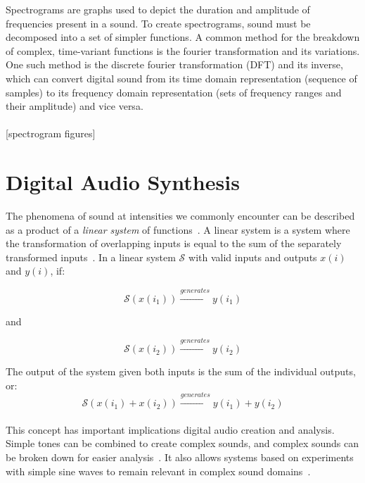 \documentclass[\main/thesis.tex]{subfiles}
\begin{document}
Spectrograms are graphs used to depict the duration and amplitude of frequencies present in a sound. To create spectrograms, sound must be decomposed into a set of simpler functions. A common method for the breakdown of complex, time-variant functions is the fourier transformation and its variations. One such method is the discrete fourier transformation (DFT) and its inverse, which can convert digital sound from its time domain representation (sequence of samples) to its frequency domain representation (sets of frequency ranges and their amplitude) and vice versa.\\\\

[spectrogram figures]


\section{Digital Audio Synthesis}
\label{sec_digital_synthesis}
The phenomena of sound at intensities we commonly encounter can be described as a product of a \textit{linear system} of functions~\cite{cook1999chap4}. A linear system is a system where the transformation of overlapping inputs is equal to the sum of the separately transformed inputs~\cite{lyons2004understandingChap1,cook1999chap4}. In a linear system $\mathcal{S}$ with valid inputs and outputs $x(i)$ and $y(i)$, if:

\begin{equation}
 \mathcal{S}(x(i_1)) \xrightarrow{generates} y(i_1)
\end{equation}
\begin{center}
    and
\end{center}
\begin{equation}
\mathcal{S}(x(i_2)) \xrightarrow{generates}y(i_2)
\end{equation}

The output of the system given both inputs is the sum of the individual outputs, or:
\begin{equation}
 \mathcal{S}(x(i_1)+x(i_2)) \xrightarrow{generates} y(i_1)+y(i_2) 
\end{equation}
\\
This concept has important implications digital audio creation and analysis. Simple tones can be combined to create complex sounds, and complex sounds can be broken down for easier analysis~\cite{lyons2004understandingChap1}. It also allows systems based on experiments with simple sine waves to remain relevant in complex sound domains~\cite{cook1999chap4}.
\end{document}
